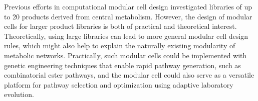 \documentclass[12pt]{article}
\begin{document}

Previous efforts in computational modular cell design investigated libraries of up to 20 products derived from central metabolism.\citep{garcia2019,garcia2019d}
However, the design of modular cells for larger product libraries is both of practical and theoretical interest.
Theoretically, using large libraries can lead to more general modular cell design rules, which might also help to explain the naturally existing modularity of metabolic networks.\citep{garcia2019b}
Practically, such modular cells could be implemented with genetic engineering techniques that enable rapid pathway generation, such as combinatorial ester pathways,\citep{layton2014} and the modular cell could also serve as a versatile platform for pathway selection and optimization using adaptive laboratory evolution.\citep{wilbanks2017}
\end{document}
